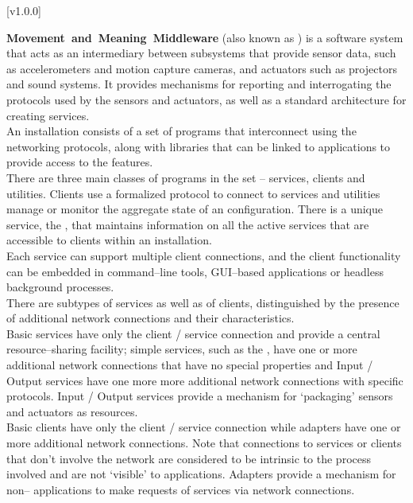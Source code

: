 [v1.0.0]

\textbf{Movement~and~Meaning~Middleware} (also known as \mplusm{}) is a software system
that acts as an intermediary between subsystems that provide sensor data, such as
accelerometers and motion capture cameras, and actuators such as projectors and sound
systems.
It provides mechanisms for reporting and interrogating the protocols used by the sensors
and actuators, as well as a standard architecture for creating services.\\

An \mplusm{} installation consists of a set of programs that interconnect using the
 networking
protocols, along with libraries that can be linked to applications to provide access to
the \mplusm{} features.\\

There are three main classes of programs in the set -- services, clients and utilities.
Clients use a formalized protocol to connect to services and utilities manage or monitor
the aggregate state of an \mplusm{} configuration.
There is a unique service, the , that
maintains information on all the active services that are accessible to clients within an
\mplusm{} installation.\\

Each service can support multiple client connections, and the client functionality can be
embedded in command--line tools, GUI--based applications or headless background
processes.\\

There are subtypes of services as well as of clients, distinguished by the presence of
additional \yarp{} network connections and their characteristics.\\

Basic services have only the client / service \yarp{} connection and provide a central
resource--sharing facility; simple services, such as the
, have one or more additional \yarp{}
network connections that have no special properties and Input / Output services have one
more more additional \yarp{} network connections with specific protocols.
Input / Output services provide a mechanism for `packaging' sensors and actuators as
\mplusm{} resources.\\

Basic clients have only the client / service \yarp{} connection while adapters have one or
more additional \yarp{} network connections. Note that connections to services or clients
that don't involve the \yarp{} network are considered to be intrinsic to the process
involved and are not `visible' to \mplusm{} applications. Adapters provide a mechanism for
non--\mplusm{} applications to make requests of \mplusm{} services via \yarp{} network
connections.

\primaryEnd{}
